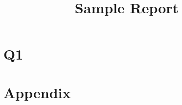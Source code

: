
\title{Sample Report}


    \maketitle
    \tableofcontents
    \newpage

    \section{Q1}

    \section{Appendix}


